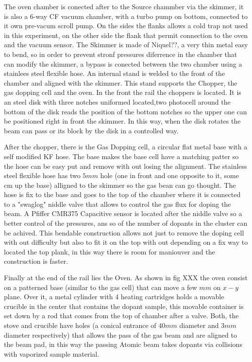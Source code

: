 The oven chamber is conected after to the Source chammber via the skimmer, it is also a 6-way CF vacuum chamber, with a turbo pump  on bottom, connected to it own pre-vacum scroll pump. On the sides the flanks allows a cold trap not used in this experiment, on the other side  the flank that permit connection to the oven and the vacuum sensor. The Skimmer is made of Niquel??, a very thin metal easy to bend, so in order to prevent stronf pressures diferrence in the chamber that can modify the skimmer, a bypass is conected between the two chamber using a stainlees steel flexible hose.  
An internal stand is welded to the front of the chamber and aligned with the skimmer. This stand supports the Chopper, the gas dopping cell and the oven.
In the front the rail the choppers is located.  It is an steel  disk with three notches uniformed located,two photocell around the bottom of the disk reads the position of the bottom notches so the upper one can be positioned right in front the skimmer. In this way, when the disk rotates the beam can pass or its block by the disk  in a controlled way.  

After the chopper, there is the Gas Dopping cell, a circular flat metal base with a self modified KF hose. The base makes the base cell have a matching patter so the hose can be easy put and remove with out losing the alignment. The stainless steel flexible hose has two $5mm$ hole (one in front and one opposite to it, some cm up the base) alligned to the skimmer so the gas bean can go thought. The hose is fix to the base and goes to the top of the chamber where it is connected to a "swaglog" niddle valve that allows to control the gas flux for doping the beam. A Pfiffer CMR375 Capacitive sensor is located after the niddle valve so a better control of the pressures, ans so of the number of dopants in the cluster can be achived. This bendable construction allows not just to remove the doping cell with out difficulty but also to fit it on the top with out depending on a fix way to located the top plank, in this way there is room for maniouver and the construction is faster.

Finally at the end of the rail lies the Oven. As shown in fig XXX the oven consist on a patterned base (similar to the gas cell) that can  move a few $mm$ on $x-y$ plane. Over it, a metal cylinder with 4 heating cartridges holds a movable crucible in the center that contains the dopant sample, this movable container is set down by a rod that comes from the top of chamber after a valve. Both, the stove and crucible have holes (a conical entrance of $40mm$ diameter and $3mm$ diameter respectively) that allows the pass of the gas beam and are aligned to the beam pad, in this way  the passing Atomic beam takes dopants via collisions with vaporized sample material.

